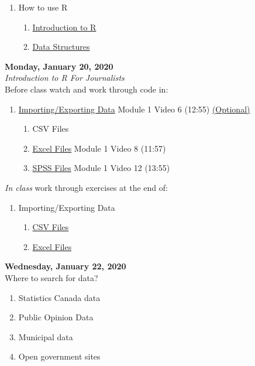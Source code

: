 \documentclass{article}
\begin{document}
\begin{enumerate}
\item How to use R
\begin{enumerate}

\item \href{http://code.r-journalism.com/chapter-1/#section-intro-to-r}{Introduction to R}
\item \href{http://code.r-journalism.com/chapter-1/#section-data-structures-in-r}{Data Structures}
\end{enumerate}
\end{enumerate}
\bigskip
\textbf{Monday, January 20, 2020\\}
\emph{Introduction to R For Journalists}\\
Before class watch and work through code in:
\begin{enumerate}
\item \href{https://youtu.be/IrCpddfUVsY}{Importing/Exporting Data} Module 1 Video 6 (12:55) \underline{(Optional) }
\begin{enumerate}
\item CSV Files 
\item \href{https://youtu.be/B5iKikPvdBk}{Excel Files} Module 1 Video 8 (11:57)
\item \href{https://youtu.be/q3p6_v_6g9c}{SPSS Files} Module 1 Video 12 (13:55)
\end{enumerate}
\end{enumerate}
\bigskip
\emph{In class} work through exercises at the end of:
\begin{enumerate}
\item Importing/Exporting Data
\begin{enumerate}
\item \href{http://code.r-journalism.com/chapter-2/#section-csvs}{CSV Files}
\item \href{http://code.r-journalism.com/chapter-2/#section-excel}{Excel Files}
\end{enumerate}	
\end{enumerate}
\bigskip
\textbf{Wednesday, January 22, 2020\\}
Where to search for data?\\
\begin{enumerate}
\item Statistics Canada data
\item Public Opinion Data
\item Municipal data 
\item Open government sites 
\end{enumerate}
\end{document}
